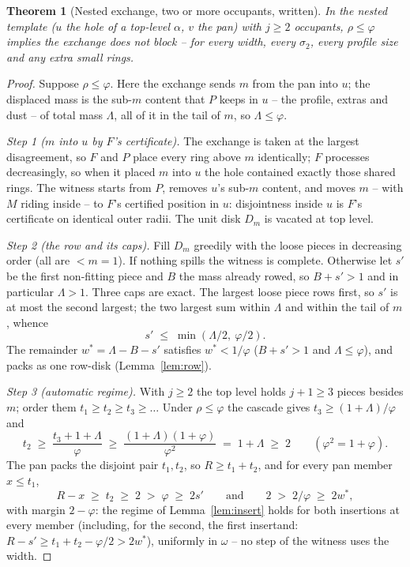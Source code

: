 \documentclass[11pt]{article}
\newtheorem{theorem}{Theorem}
\theoremstyle{definition}
\begin{document}
\begin{theorem}[Nested exchange, two or more occupants,
written]\label{thm:nestedwritten}
In the nested template ($u$ the hole of a top-level $\alpha$, $v$
the pan) with $j\ge2$ occupants, $\rho\le\varphi$ implies the
exchange does not block -- for every width, every $\sigma_2$, every
profile size and any extra small rings.
\end{theorem}
\begin{proof}
Suppose $\rho\le\varphi$. Here the exchange sends $m$ from the pan
into $u$; the displaced mass is the sub-$m$ content that $P$ keeps
in $u$ -- the profile, extras and dust -- of total mass $\Lambda$,
all of it in the tail of $m$, so $\Lambda\le\varphi$.

\emph{Step 1 ($m$ into $u$ by $F$'s certificate).} The exchange is
taken at the largest disagreement, so $F$ and $P$ place every ring
above $m$ identically; $F$ processes decreasingly, so when it
placed $m$ into $u$ the hole contained exactly those shared rings.
The witness starts from $P$, removes $u$'s sub-$m$ content, and
moves $m$ -- with $M$ riding inside -- to $F$'s certified position
in $u$: disjointness inside $u$ is $F$'s certificate on identical
outer radii. The unit disk $D_m$ is vacated at top level.

\emph{Step 2 (the row and its caps).} Fill $D_m$ greedily with the
loose pieces in decreasing order (all are $<m=1$). If nothing
spills the witness is complete. Otherwise let $s'$ be the first
non-fitting piece and $B$ the mass already rowed, so $B+s'>1$ and
in particular $\Lambda>1$. Three caps are exact. The largest loose
piece rows first, so $s'$ is at most the second largest; the two
largest sum within $\Lambda$ and within the tail of $m$, whence
\[
s'\;\le\;\min(\Lambda/2,\ \varphi/2).
\]
The remainder $w^{*}=\Lambda-B-s'$ satisfies $w^{*}<1/\varphi$
($B+s'>1$ and $\Lambda\le\varphi$), and packs as one row-disk
(Lemma~\ref{lem:row}).

\emph{Step 3 (automatic regime).} With $j\ge2$ the top level holds
$j+1\ge3$ pieces besides $m$; order them $t_1\ge t_2\ge t_3\ge
\dots$ Under $\rho\le\varphi$ the cascade gives
$t_3\ge(1+\Lambda)/\varphi$ and
\[
t_2\;\ge\;\frac{t_3+1+\Lambda}{\varphi}
\;\ge\;\frac{(1+\Lambda)(1+\varphi)}{\varphi^{2}}
\;=\;1+\Lambda\;\ge\;2
\qquad(\varphi^{2}=1+\varphi).
\]
The pan packs the disjoint pair $t_1,t_2$, so $R\ge t_1+t_2$, and
for every pan member $x\le t_1$,
\[
R-x\;\ge\;t_2\;\ge\;2\;>\;\varphi\;\ge\;2s'
\qquad\text{and}\qquad
2\;>\;2/\varphi\;\ge\;2w^{*},
\]
with margin $2-\varphi$: the regime of Lemma~\ref{lem:insert} holds
for both insertions at every member (including, for the second, the
first insertand: $R-s'\ge t_1+t_2-\varphi/2>2w^{*}$), uniformly in
$\omega$ -- no step of the witness uses the width.


\end{proof}
\end{document}

